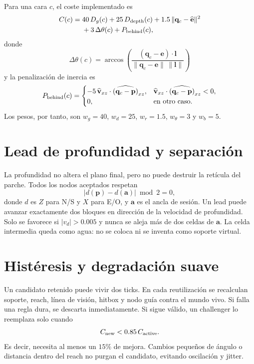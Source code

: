 \documentclass[11pt,a4paper]{article}
\begin{document}
Para una cara $c$, el coste implementado es
\begin{equation}
 \begin{split}
 C(c)={}&40\,D_g(c)+25\,D_{\rm depth}(c)
       +1.5\,\|\mathbf q_c-\widehat{\mathbf e}\|^2\\
      &+3\,\Delta\theta(c)+P_{\rm behind}(c),
 \end{split}
\end{equation}
donde
\begin{equation}
 \Delta\theta(c)=\arccos\!\left(
 \frac{(\mathbf q_c-\mathbf e)\cdot\mathbf l}
 {\|\mathbf q_c-\mathbf e\|\,\|\mathbf l\|}\right)
\end{equation}
y la penalización de inercia es
\begin{equation}
 P_{\rm behind}(c)=
 \begin{cases}
 -5\,\widehat{\mathbf v}_{xz}\cdot\widehat{(\mathbf q_c-\mathbf p)}_{xz},
 &\widehat{\mathbf v}_{xz}\cdot\widehat{(\mathbf q_c-\mathbf p)}_{xz}<0,\\
 0,&\text{en otro caso.}
 \end{cases}
\end{equation}
Los pesos, por tanto, son $w_g=40$, $w_d=25$, $w_r=1.5$,
$w_\theta=3$ y $w_b=5$.

\section{Lead de profundidad y separación}\label{sec:depth}

La profundidad no altera el plano final, pero no puede destruir la retícula del
parche. Todos los nodos aceptados respetan
\begin{equation}
 |d(\mathbf p)-d(\mathbf a)|\bmod2=0,
\end{equation}
donde $d$ es $Z$ para N/S y $X$ para E/O, y $\mathbf a$ es el ancla de sesión.
Un lead puede avanzar exactamente dos bloques en dirección de la velocidad de
profundidad. Solo se favorece si $|v_d|>0.005$ y nunca se aleja más de dos celdas
de $\mathbf a$. La celda intermedia queda como agua: no se coloca ni se inventa
como soporte virtual.

\section{Histéresis y degradación suave}

Un candidato retenido puede vivir dos ticks. En cada reutilización se recalculan
soporte, reach, línea de visión, hitbox y nodo guía contra el mundo vivo. Si falla
una regla dura, se descarta inmediatamente. Si sigue válido, un challenger lo
reemplaza solo cuando
\begin{equation}
 C_{\rm new}<0.85\,C_{\rm active}.
\end{equation}
Es decir, necesita al menos un $15\%$ de mejora. Cambios pequeños de ángulo o
distancia dentro del reach no purgan el candidato, evitando oscilación y jitter.
\end{document}
